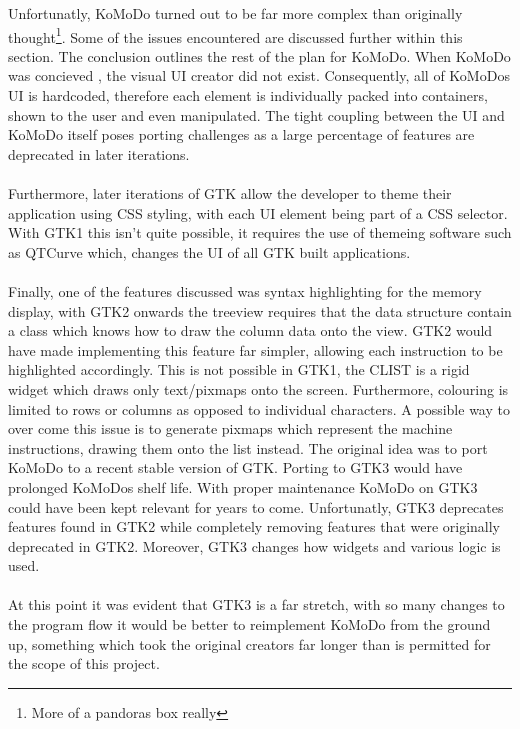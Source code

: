   Unfortunatly, KoMoDo turned out to be far more complex than originally thought\footnote{More of a pandoras box really}. Some of the issues encountered are discussed further within this section. The conclusion outlines the rest of the plan for KoMoDo.
    When KoMoDo was concieved , the visual UI creator did not exist. Consequently, all of KoMoDos UI is hardcoded, therefore each element is individually packed into containers, shown to the user and even manipulated. The tight coupling between the UI and KoMoDo itself poses porting challenges as a large percentage of features are deprecated in later iterations.\\\\
    Furthermore, later iterations of GTK allow the developer to theme their application using CSS styling, with each UI element being part of a CSS selector. With GTK1 this isn't quite possible, it requires the use of themeing software such as QTCurve which, changes the UI of all GTK built applications.\\\\
    Finally, one of the features discussed was syntax highlighting for the memory display, with GTK2 onwards the treeview requires that the data structure contain a class which knows how to draw the column data onto the view. GTK2 would have made implementing this feature far simpler, allowing each instruction to be highlighted accordingly. This is not possible in GTK1, the CLIST is a rigid widget which draws only text/pixmaps onto the screen. Furthermore, colouring is limited to rows or columns as opposed to individual characters. A possible way to over come this issue is to generate pixmaps which represent the machine instructions, drawing them onto the list instead.
    The original idea was to port KoMoDo to a recent stable version of GTK. Porting to GTK3 would have prolonged KoMoDos shelf life. With proper maintenance KoMoDo on GTK3 could have been kept relevant for years to come. Unfortunatly, GTK3 deprecates features found in GTK2 while completely removing features that were originally deprecated in GTK2. Moreover, GTK3 changes how widgets and various logic is used.\\\\
    At this point it was evident that GTK3 is a far stretch, with so many changes to the program flow it would be better to reimplement KoMoDo from the ground up, something which took the original creators far longer than is permitted for the scope of this project.
